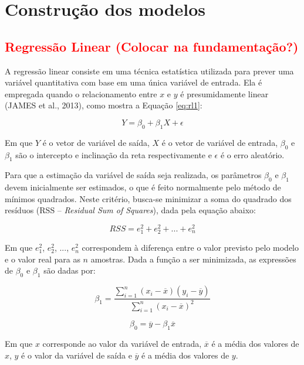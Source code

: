 \section{Construção dos modelos}

\subsection{\textcolor{red}{Regressão Linear (Colocar na fundamentação?)}}

A regressão linear consiste em uma técnica estatística utilizada para prever uma variável quantitativa com base em uma única variável de entrada. Ela é empregada quando o relacionamento entre $x$ e $y$ é presumidamente linear (JAMES et al., 2013), como mostra a Equação \ref{eq:rl1}:

\begin{equation} \label{eq:rl1}
	Y = \beta_0 + \beta_1X + \epsilon
\end{equation}

Em que $Y$ é o vetor de variável de saída, $X$ é o vetor de variável de entrada, $\beta_0$ e $\beta_1$ são o intercepto e inclinação da reta respectivamente e $\epsilon$ é o erro aleatório.

Para que a estimação da variável de saída seja realizada, os parâmetros $\beta_0$ e $\beta_1$ devem inicialmente ser estimados, o que é feito normalmente pelo método de mínimos quadrados. Neste critério, busca-se minimizar a soma do quadrado dos resíduos (RSS – \textit{Residual Sum of Squares}), dada pela equação abaixo:

\begin{equation} \label{eq:rss}
	RSS = e_1^2 + e_2^2 + ... + e_n^2
\end{equation}

Em que $e_1^2$, $e_2^2$, ..., $e_n^2$ correspondem à diferença entre o valor previsto pelo modelo e o valor real para as $n$ amostras. Dada a função a ser minimizada, as expressões de $\beta_0$ e $\beta_1$ são dadas por:

\begin{equation} \label{eq:rl2}
	\beta_1 = \frac{\sum_{i=1}^n (x_i - \overline{x})(y_i - \overline{y})}{\sum_{i=1}^n(x_i - \overline{x})^2}
\end{equation}

\begin{equation} \label{eq:rl3}
	\beta_0 = \overline{y} - \beta_1\overline{x}
\end{equation}

Em que $x$ corresponde ao valor da variável de entrada, $\overline{x}$ é a média dos valores de $x$, $y$ é o valor da variável de saída e $\overline{y}$ é a média dos valores de $y$.

